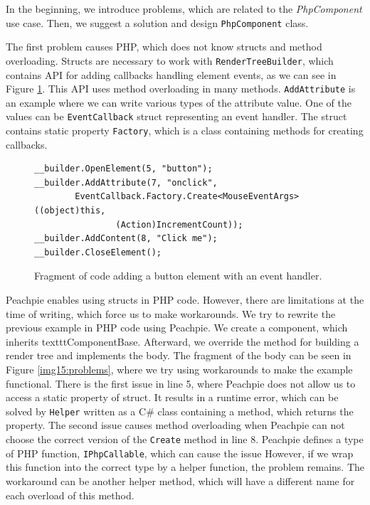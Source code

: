 In the beginning, we introduce problems, which are related to the \textit{PhpComponent} use case.
Then, we suggest a solution and design \texttt{PhpComponent} class.
\par
The first problem causes PHP, which does not know structs and method overloading.
Structs are necessary to work with \texttt{RenderTreeBuilder}, which contains API for adding callbacks handling element events, as we can see in Figure \ref{img14:callback}.
This API uses method overloading in many methods.
\texttt{AddAttribute} is an example where we can write various types of the attribute value.
One of the values can be \texttt{EventCallback} struct representing an event handler.
The struct contains static property \texttt{Factory}, which is a class containing methods for creating callbacks.
\par
\begin{figure}
\begin{lstlisting}
__builder.OpenElement(5, "button");
__builder.AddAttribute(7, "onclick", 
		EventCallback.Factory.Create<MouseEventArgs>((object)this, 
				(Action)IncrementCount));
__builder.AddContent(8, "Click me");
__builder.CloseElement();
\end{lstlisting}
\caption{Fragment of code adding a button element with an event handler.}
\label{img14:callback}
\end{figure}
\par
Peachpie enables using structs in PHP code. 
However, there are limitations at the time of writing, which force us to make workarounds.
We try to rewrite the previous example in PHP code using Peachpie.
We create a component, which inherits {textttComponentBase}. 
Afterward, we override the method for building a render tree and implements the body.
The fragment of the body can be seen in Figure \ref{img15:problems}, where we try using workarounds to make the example functional.
There is the first issue in line 5, where Peachpie does not allow us to access a static property of struct.
It results in a runtime error, which can be solved by \texttt{Helper} written as a C\# class containing a method, which returns the property.
The second issue causes method overloading when Peachpie can not choose the correct version of the \texttt{Create} method in line 8.
Peachpie defines a type of PHP function, \texttt{IPhpCallable}, which can cause the issue
However, if we wrap this function into the correct type by a helper function, the problem remains.
The workaround can be another helper method, which will have a different name for each overload of this method.

